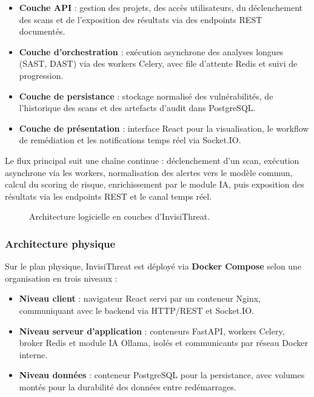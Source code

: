 \begin{itemize}
  \item \textbf{Couche API} : gestion des projets, des accès utilisateurs, du
  déclenchement des scans et de l'exposition des résultats via des endpoints REST
  documentés.
  \item \textbf{Couche d'orchestration} : exécution asynchrone des analyses longues
  (SAST, DAST) via des workers Celery, avec file d'attente Redis et suivi
  de progression.
  \item \textbf{Couche de persistance} : stockage normalisé des vulnérabilités,
  de l'historique des scans et des artefacts d'audit dans PostgreSQL.
  \item \textbf{Couche de présentation} : interface React pour la visualisation,
  le workflow de remédiation et les notifications temps réel via Socket.IO.
\end{itemize}

Le flux principal suit une chaîne continue : déclenchement d'un scan, exécution
asynchrone via les workers, normalisation des alertes vers le modèle commun,
calcul du scoring de risque, enrichissement par le module IA, puis exposition
des résultats via les endpoints REST et le canal temps réel.

\begin{figure}[H]
\centering
\fbox{\rule{0pt}{2in}\rule{0.9\linewidth}{0pt}}
\caption{Architecture logicielle en couches d'InvisiThreat.}
\label{fig:archi-logicielle}
\end{figure}

\subsubsection{Architecture physique}

Sur le plan physique, InvisiThreat est déployé via \textbf{Docker Compose} selon
une organisation en trois niveaux :

\begin{itemize}
  \item \textbf{Niveau client} : navigateur React servi par un conteneur Nginx,
  communiquant avec le backend via HTTP/REST et Socket.IO.
  \item \textbf{Niveau serveur d'application} : conteneurs FastAPI, workers Celery,
  broker Redis et module IA Ollama, isolés et communicants par réseau Docker interne.
  \item \textbf{Niveau données} : conteneur PostgreSQL pour la persistance, avec
  volumes montés pour la durabilité des données entre redémarrages.
\end{itemize}

